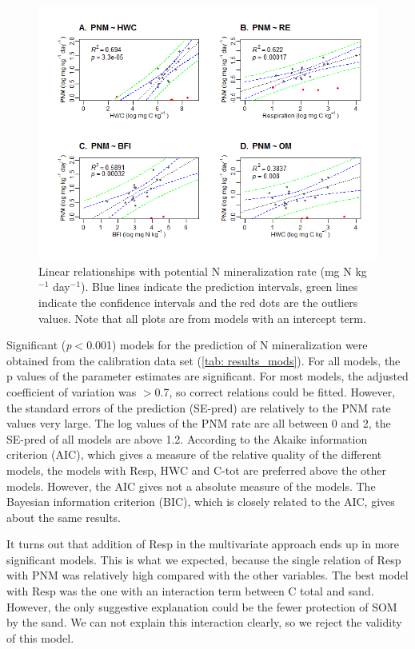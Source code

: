 \documentclass[10pt,twoside,dutch,english]{report}
\begin{document}
\begin{figure}[ht] %
	\includegraphics[width=1\linewidth]{results_models}
	\caption{Linear relationships with potential N mineralization rate (mg N kg$^{-1}$ day$^{-1}$). Blue lines indicate the prediction intervals, green lines indicate the confidence intervals and the red dots are the outliers values. Note that all plots are from models with an intercept term.}
	\label{fig:results_models}
\end{figure}

Significant (\textit{p}$<$0.001) models for the prediction of N mineralization were obtained from the calibration data set (\ref{tab: results_mods}). For all models, the p values of the parameter estimates are significant. For most models, the adjusted coefficient of variation was $>$0.7, so correct relations could be fitted. However, the standard errors of the prediction (SE-pred) are relatively to the PNM rate values very large. The log values of the PNM rate are all between 0 and 2, the SE-pred of all models are above 1.2.   According to the Akaike information criterion (AIC), which gives a measure of the relative quality of the different models, the models with Resp, HWC and C-tot are preferred above the other models. However, the AIC gives not a absolute measure of the models. The Bayesian information criterion (BIC), which is closely related to the AIC, gives about the same results. 
 
 It turns out that addition of Resp in the multivariate approach ends up in more significant models. This is what we expected, because the single relation of Resp with PNM was relatively high compared with the other variables. 
 The best model with Resp was the one with an interaction term between C total and sand. However, the only suggestive explanation could be the fewer protection of SOM by the sand.  We can not explain this interaction clearly, so we reject the validity of this model. 
 
\end{document}
